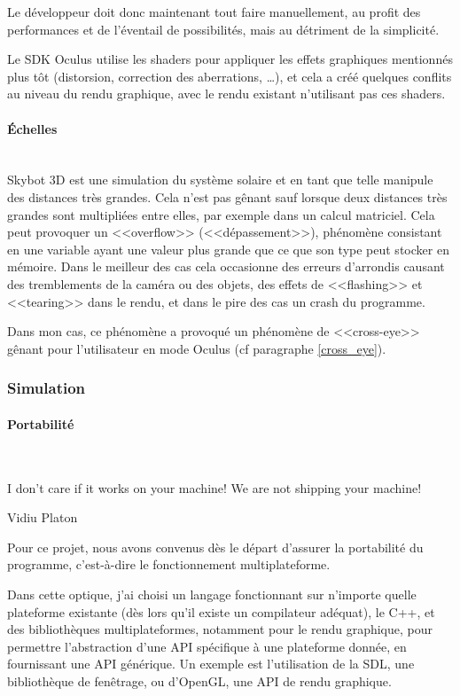 \documentclass[a4paper,french,12pt]{article}
\begin{document}
		Le développeur doit donc maintenant tout faire manuellement, au profit des performances et de l'éventail
		de possibilités, mais au détriment de la simplicité.
		
		Le SDK Oculus utilise les shaders pour appliquer les effets graphiques mentionnés plus tôt (distorsion, 
		correction des aberrations, \ldots), et cela a créé quelques conflits au niveau du rendu graphique, 
		avec le rendu existant n'utilisant pas ces shaders.
		
	    \paragraph{Échelles} ~\\
	      Skybot 3D est une simulation du système solaire et en tant que telle manipule des distances très grandes.
	      Cela n'est pas gênant sauf lorsque deux distances très grandes sont multipliées entre elles, par exemple
	      dans un calcul matriciel.
	      Cela peut provoquer un <<overflow>> (<<dépassement>>), phénomène consistant en une variable ayant une valeur
	      plus grande que ce que son type peut stocker en mémoire. Dans le meilleur des cas cela occasionne des 
	      erreurs d'arrondis causant des tremblements de la caméra ou des objets, des effets de <<flashing>> et
	      <<tearing>> dans le rendu, et dans le pire des cas un crash du programme.
	      
	      Dans mon cas, ce phénomène a provoqué un phénomène de <<cross-eye>> gênant pour l'utilisateur en mode
	      Oculus (cf paragraphe \ref{cross_eye}).
		
	    \subsubsection{Simulation}
		\paragraph{Portabilité} ~\\
		  \epigraph{I don’t care if it works on your machine!  We are not shipping your machine!}{Vidiu Platon}
		
		  Pour ce projet, nous avons convenus dès le départ d'assurer la portabilité du programme, c'est-à-dire
		  le fonctionnement multiplateforme.
		  
		  Dans cette optique, j'ai choisi un langage fonctionnant sur n'importe quelle plateforme existante 
		  (dès lors qu'il existe un compilateur adéquat), le C++, et
		  des bibliothèques multiplateformes, notamment pour le rendu graphique,
		  pour permettre l'abstraction d'une API spécifique à une plateforme donnée, en fournissant une API générique.
		  Un exemple est l'utilisation de la SDL, une bibliothèque de fenêtrage, ou d'OpenGL, une API de rendu
		  graphique.
		  
\end{document}
